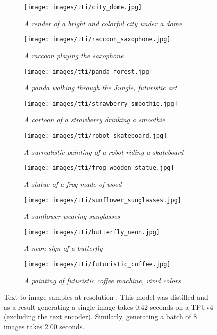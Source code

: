 \documentclass[nohyperref]{article}
\theoremstyle{plain}
\theoremstyle{definition}
\theoremstyle{remark}
\begin{document}
\begin{figure*}
\centering
\begin{subfigure}[t]{0.33\textwidth}
\centering
\texttt{[image: images/tti/city\_dome.jpg]}
\caption{\textit{A render of a bright and colorful city under a dome}}
 \end{subfigure} \hfill
\begin{subfigure}[t]{0.33\textwidth}
\centering
\texttt{[image: images/tti/raccoon\_saxophone.jpg]}
\caption{\textit{A raccoon playing the saxophone}}
 \end{subfigure} \hfill
\begin{subfigure}[t]{0.33\textwidth}
\centering
\texttt{[image: images/tti/panda\_forest.jpg]}
\caption{\textit{A panda walking through the Jungle, futuristic art}}
\end{subfigure}
\begin{subfigure}[t]{0.33\textwidth}
\centering
\texttt{[image: images/tti/strawberry\_smoothie.jpg]}
\caption{\textit{A cartoon of a strawberry drinking a smoothie}}
\end{subfigure} \hfill
\begin{subfigure}[t]{0.33\textwidth}
\centering
\texttt{[image: images/tti/robot\_skateboard.jpg]}
\caption{\textit{A surrealistic painting of a robot riding a skateboard}}
\end{subfigure} \hfill
\begin{subfigure}[t]{0.33\textwidth}
\centering
\texttt{[image: images/tti/frog\_wooden\_statue.jpg]}
\caption{\textit{A statue of a frog made of wood}}
\end{subfigure}
\begin{subfigure}[t]{0.33\textwidth}
\centering
\texttt{[image: images/tti/sunflower\_sunglasses.jpg]}
\caption{\textit{A sunflower wearing sunglasses}}
\end{subfigure} \hfill
\begin{subfigure}[t]{0.33\textwidth}
\centering
\texttt{[image: images/tti/butterfly\_neon.jpg]}
\caption{\textit{A neon sign of a butterfly}}
\end{subfigure} \hfill
\begin{subfigure}[t]{0.33\textwidth}
\centering
\texttt{[image: images/tti/futuristic\_coffee.jpg]}
\caption{\textit{A painting of futuristic coffee machine, vivid colors}}
\end{subfigure}
\caption{Text to image samples at resolution . This model was distilled and as a result generating a single image takes 0.42 seconds on a TPUv4 (excluding the text encoder). Similarly, generating a batch of 8 images takes 2.00 seconds.}
\end{figure*}
\end{document}
